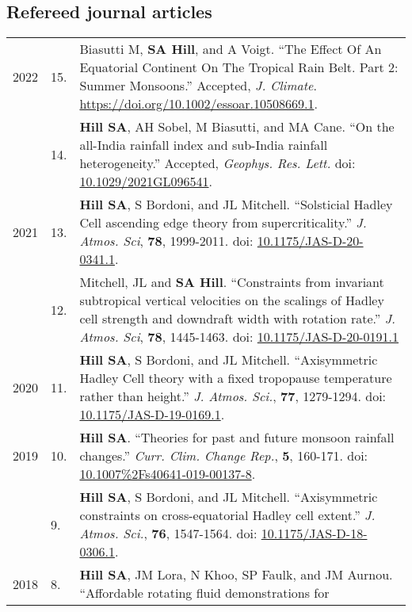 \documentclass[letterpaper,11pt]{shillcv}
\begin{document}
\subsection*{Refereed journal articles}
\begin{longtable}{@{} Y{0.05\textwidth} >{\color{black}} p{0.04\textwidth} @{} L{0.91\textwidth} @{}}
2022 & 15. & Biasutti M, \textbf{SA Hill}, and A Voigt.  ``The Effect Of An Equatorial Continent On The Tropical Rain Belt. Part 2: Summer Monsoons.''  Accepted, \emph{J. Climate}.   \href{https://doi.org/10.1002/essoar.10508669.1}{https://doi.org/10.1002/essoar.10508669.1}.\\
     & 14. & \textbf{Hill SA}, AH Sobel, M Biasutti, and MA Cane.  ``On the all-India rainfall index and sub-India rainfall heterogeneity.''  Accepted, \emph{Geophys. Res. Lett.}  doi: \href{https://doi.org/10.1029/2021GL096541}{10.1029/2021GL096541}.\\
2021 & 13. & \textbf{Hill SA}, S Bordoni, and JL Mitchell.  ``Solsticial Hadley Cell ascending edge theory from supercriticality.''  \emph{J. Atmos. Sci}, \textbf{78}, 1999-2011.  doi: \href{https://doi.org/10.1175/JAS-D-20-0341.1}{10.1175/JAS-D-20-0341.1}.\\
     & 12. & Mitchell, JL and \textbf{SA Hill}.  ``Constraints from invariant
subtropical vertical velocities on the scalings of Hadley cell strength and
downdraft width with rotation rate.''  \emph{J. Atmos. Sci}, \textbf{78}, 1445-1463.  doi: \href{https://doi.org/10.1175/JAS-D-20-0191.1}{10.1175/JAS-D-20-0191.1}\\
2020 &  11. & \textbf{Hill SA}, S Bordoni, and JL Mitchell.
``Axisymmetric Hadley Cell theory with a fixed tropopause temperature rather
than height.'' \emph{J. Atmos. Sci.}, \textbf{77}, 1279-1294.  doi: \href{https://doi.org/10.1175/JAS-D-19-0169.1}{10.1175/JAS-D-19-0169.1}.\\
2019 & 10. & \textbf{Hill SA}.  ``Theories for past and future monsoon rainfall
changes.'' \emph{Curr. Clim. Change Rep.}, \textbf{5}, 160-171.  doi: \href{https://doi.org/10.1007\%2Fs40641-019-00137-8}{10.1007\%2Fs40641-019-00137-8}.\\
     & 9. & \textbf{Hill SA}, S Bordoni, and JL Mitchell.
``Axisymmetric constraints on cross-equatorial Hadley cell extent.''
\emph{J. Atmos. Sci.}, \textbf{76}, 1547-1564.  doi: \href{https://doi.org/10.1175/JAS-D-18-0306.1}{10.1175/JAS-D-18-0306.1}.\\
2018 & 8. & \textbf{Hill SA}, JM Lora, N Khoo, SP Faulk, and
JM Aurnou.  ``Affordable rotating fluid demonstrations for

\end{longtable}
\end{document}
